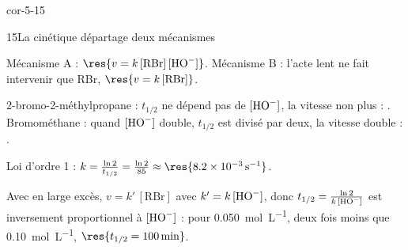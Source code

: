 \begin{blocLivre}{cor-5-15}
\begin{corrige}{15}{La cinétique départage deux mécanismes}
\begin{questions}
\item Mécanisme A : $\res{v=k\,[\mathrm{RBr}]\,[\ce{HO-}]}$. Mécanisme B : l'acte lent ne fait intervenir que RBr,
$\res{v=k\,[\mathrm{RBr}]}$.
\item 2-bromo-2-méthylpropane : $t_{1/2}$ ne dépend pas de $[\ce{HO-}]$, la vitesse non plus : .
Bromométhane : quand $[\ce{HO-}]$ double, $t_{1/2}$ est divisé par deux, la vitesse double : .
\item Loi d'ordre 1 : $k=\frac{\ln2}{t_{1/2}}=\frac{\ln2}{85}\approx\res{\qty{8,2e-3}{s^{-1}}}$.
\item Avec  en large excès, $v=k'\,[\mathrm{RBr}]$ avec $k'=k\,[\ce{HO-}]$, donc
$t_{1/2}=\frac{\ln2}{k\,[\ce{HO-}]}$ est inversement proportionnel à $[\ce{HO-}]$ : pour \qty{0,050}{mol.L^{-1}},
deux fois moins que \qty{0,10}{mol.L^{-1}}, $\res{t_{1/2}=\qty{100}{min}}$.
\end{questions}
\end{corrige}
\end{blocLivre}

